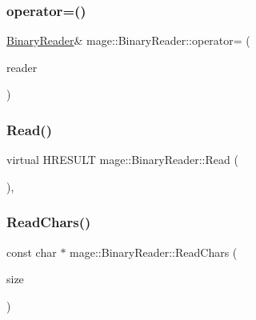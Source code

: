 \hypertarget{classmage_1_1_binary_reader_abb971fe92727a0e86b3698dba8c586de}{}\label{classmage_1_1_binary_reader_abb971fe92727a0e86b3698dba8c586de} 
\subsubsection{\texorpdfstring{operator=()}{operator=()}\hspace{0.1cm}{\footnotesize\ttfamily [2/2]}}
{\footnotesize\ttfamily \hyperlink{classmage_1_1_binary_reader}{Binary\+Reader}\& mage\+::\+Binary\+Reader\+::operator= (\begin{DoxyParamCaption}\item[{\hyperlink{classmage_1_1_binary_reader}{Binary\+Reader} \&\&}]{reader }\end{DoxyParamCaption})\hspace{0.3cm}{\ttfamily [delete]}}

\hypertarget{classmage_1_1_binary_reader_a000cf97b640a5fbd1d5c33ccaae7fb39}{}\label{classmage_1_1_binary_reader_a000cf97b640a5fbd1d5c33ccaae7fb39} 
\subsubsection{\texorpdfstring{Read()}{Read()}}
{\footnotesize\ttfamily virtual H\+R\+E\+S\+U\+LT mage\+::\+Binary\+Reader\+::\+Read (\begin{DoxyParamCaption}{ }\end{DoxyParamCaption})\hspace{0.3cm}{\ttfamily [private]}, {}}

\hypertarget{classmage_1_1_binary_reader_af1e0e4ab815e23c72ab65fd7c0748d3f}{}\label{classmage_1_1_binary_reader_af1e0e4ab815e23c72ab65fd7c0748d3f} 
\subsubsection{\texorpdfstring{Read\+Chars()}{ReadChars()}}
{\footnotesize\ttfamily const char $\ast$ mage\+::\+Binary\+Reader\+::\+Read\+Chars (\begin{DoxyParamCaption}\item[{size\+\_\+t}]{size }\end{DoxyParamCaption})\hspace{0.3cm}{\ttfamily [protected]}}

